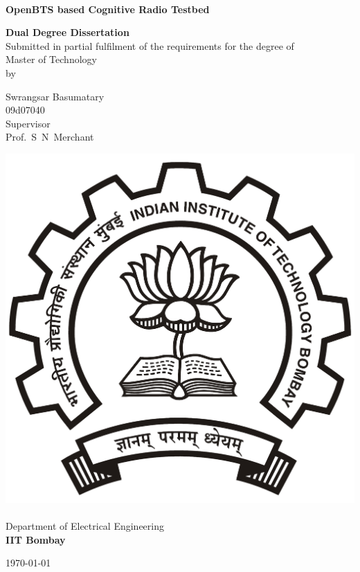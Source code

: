 \begin{titlepage}
\begin{center}
\begin{spacing}{1.0}


~\\[0.3cm]
{ \LARGE \bfseries OpenBTS based Cognitive Radio Testbed\\[1.2cm] }

\textbf{\large Dual Degree Dissertation}\\[1.2cm]

{Submitted in partial fulfilment of the requirements for the degree 
of\\[0.1cm]
Master of Technology\\[0.3cm]
by\\[0.3cm]}

{\LARGE Swrangsar Basumatary \\[0.1cm]}
{09d07040 \\[1.1cm]}
{Supervisor \\[0.1cm]}
{\LARGE Prof.~S~N~Merchant \\[1.3cm]}

\includegraphics[width=0.21\textheight]{iitbLogo}~\\[0.9cm]
Department of Electrical Engineering\\[0.2cm]
\textbf{\large IIT Bombay}\\[1.3cm]


\vfill

{\large \today}

\end{spacing}
\end{center}
\end{titlepage}

